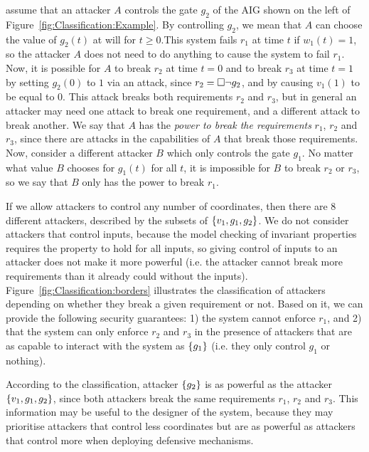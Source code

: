  assume that an attacker $A$ controls the gate $g_2$ of the AIG shown on the left of Figure~\ref{fig:Classification:Example}. By controlling $g_2$, we mean that $A$ can choose the value of $g_2(t)$ at will for $t\geq 0$.This system fails $r_1$ at time $t$ if $w_1(t)=1$, so the attacker $A$ does not need to do anything to cause the system to fail $r_1$. Now, it is possible for $A$ to break $r_2$ at time $t=0$ and to break $r_3$ at time $t=1$ by setting $g_2(0)$ to $1$ via an attack, since $r_2={{\square}} \lnot g_2$, and by causing $v_1(1)$ to be equal to $0$. This attack breaks both requirements $r_2$ and $r_3$, but in general an attacker may need one attack to break one requirement, and a different attack to break another. We say that $A$ has the \emph{power to break the requirements} $r_1$, $r_2$ and $r_3$, since there are attacks in the capabilities of $A$ that break those requirements. Now, consider a different attacker $B$ which only controls the gate $g_1$. No matter what value $B$ chooses for $g_1(t)$ for all $t$, it is impossible for $B$ to break $r_2$ or $r_3$, so we say that $B$ only has the power to break $r_1$. 



If we allow attackers to control any number of coordinates, then there are $8$ different attackers, described by the subsets of $\left\{v_1,g_1,g_2\right\}$. We do not consider attackers that control inputs, because the model checking of invariant properties requires the property to hold for all inputs, so giving control of inputs to an attacker does not make it more powerful (i.e. the attacker cannot break more requirements than it already could without the inputs). Figure~\ref{fig:Classification:borders} illustrates the classification of attackers depending on whether they break a given requirement or not. Based on it, we can provide the following security guarantees: 1) the system cannot enforce $r_1$, and 2) that the system can only enforce $r_2$ and $r_3$ in the presence of attackers that are as capable to interact with the system as $\left\{g_1\right\}$ (i.e. they only control $g_1$ or nothing).

According to the classification, attacker $\left\{g_2\right\}$ is as powerful as the attacker $\left\{v_1,g_1,g_2\right\}$, since both attackers break the same requirements $r_1$, $r_2$ and $r_3$. This information may be useful to the designer of the system, because they may prioritise attackers that control less coordinates but are as powerful as attackers that control more when deploying defensive mechanisms.



